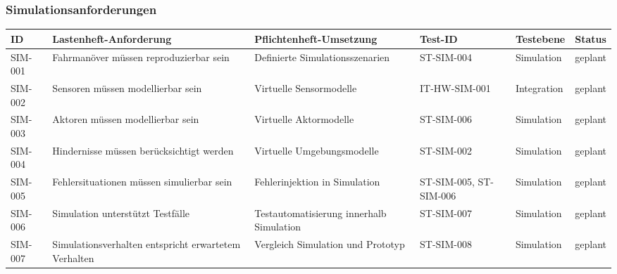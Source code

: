 \documentclass[
  a4paper,
  12pt,
  DIV=12,        %
  parskip=half,  %
  headings=small %
]{scrartcl}
\theoremstyle{definition}
\theoremstyle{definition}
\begin{document}
\begin{landscape}
\subsubsection{Simulationsanforderungen}\label{simulationsanforderungen}

\begin{longtable}[]{@{}
  >{\raggedright\arraybackslash}p{}
  >{\raggedright\arraybackslash}p{}
  >{\raggedright\arraybackslash}p{}
  >{\raggedright\arraybackslash}p{}
  >{\raggedright\arraybackslash}p{}
  >{\raggedright\arraybackslash}p{}@{}}
\toprule\noalign{}
\begin{minipage}[b]{\linewidth}\raggedright
ID
\end{minipage} & \begin{minipage}[b]{\linewidth}\raggedright
Lastenheft-Anforderung
\end{minipage} & \begin{minipage}[b]{\linewidth}\raggedright
Pflichtenheft-Umsetzung
\end{minipage} & \begin{minipage}[b]{\linewidth}\raggedright
Test-ID
\end{minipage} & \begin{minipage}[b]{\linewidth}\raggedright
Testebene
\end{minipage} & \begin{minipage}[b]{\linewidth}\raggedright
Status
\end{minipage} \\
\midrule\noalign{}
\endhead
\bottomrule\noalign{}
\endlastfoot
SIM-001 & Fahrmanöver müssen reproduzierbar sein & Definierte
Simulationsszenarien & ST-SIM-004 & Simulation & geplant \\
SIM-002 & Sensoren müssen modellierbar sein & Virtuelle Sensormodelle &
IT-HW-SIM-001 & Integration & geplant \\
SIM-003 & Aktoren müssen modellierbar sein & Virtuelle Aktormodelle &
ST-SIM-006 & Simulation & geplant \\
SIM-004 & Hindernisse müssen berücksichtigt werden & Virtuelle
Umgebungsmodelle & ST-SIM-002 & Simulation & geplant \\
SIM-005 & Fehlersituationen müssen simulierbar sein & Fehlerinjektion in
Simulation & ST-SIM-005, ST-SIM-006 & Simulation & geplant \\
SIM-006 & Simulation unterstützt Testfälle & Testautomatisierung
innerhalb Simulation & ST-SIM-007 & Simulation & geplant \\
SIM-007 & Simulationsverhalten entspricht erwartetem Verhalten &
Vergleich Simulation und Prototyp & ST-SIM-008 & Simulation & geplant \\
\end{longtable}
\end{landscape}
\end{document}
